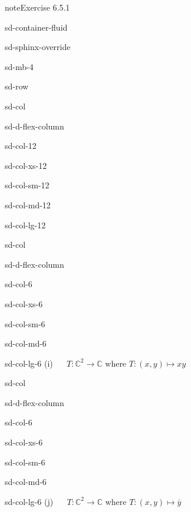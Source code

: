 \documentclass[letterpaper,10pt,english]{jupyterBook}
\begin{document}
\begin{sphinxadmonition}{note}{Exercise 6.5.1}
\begin{sphinxuseclass}{sd-container-fluid}
\begin{sphinxuseclass}{sd-sphinx-override}
\begin{sphinxuseclass}{sd-mb-4}
\begin{sphinxuseclass}{sd-row}
\begin{sphinxuseclass}{sd-col}
\begin{sphinxuseclass}{sd-d-flex-column}
\begin{sphinxuseclass}{sd-col-12}
\begin{sphinxuseclass}{sd-col-xs-12}
\begin{sphinxuseclass}{sd-col-sm-12}
\begin{sphinxuseclass}{sd-col-md-12}
\begin{sphinxuseclass}{sd-col-lg-12}
\end{sphinxuseclass}
\end{sphinxuseclass}
\end{sphinxuseclass}
\end{sphinxuseclass}
\end{sphinxuseclass}
\end{sphinxuseclass}
\end{sphinxuseclass}
\begin{sphinxuseclass}{sd-col}
\begin{sphinxuseclass}{sd-d-flex-column}
\begin{sphinxuseclass}{sd-col-6}
\begin{sphinxuseclass}{sd-col-xs-6}
\begin{sphinxuseclass}{sd-col-sm-6}
\begin{sphinxuseclass}{sd-col-md-6}
\begin{sphinxuseclass}{sd-col-lg-6}
\sphinxAtStartPar
(i)   \(T: \mathbb{C}^2 \to \mathbb{C}\) where \(T: (x, y) \mapsto x y\)

\end{sphinxuseclass}
\end{sphinxuseclass}
\end{sphinxuseclass}
\end{sphinxuseclass}
\end{sphinxuseclass}
\end{sphinxuseclass}
\end{sphinxuseclass}
\begin{sphinxuseclass}{sd-col}
\begin{sphinxuseclass}{sd-d-flex-column}
\begin{sphinxuseclass}{sd-col-6}
\begin{sphinxuseclass}{sd-col-xs-6}
\begin{sphinxuseclass}{sd-col-sm-6}
\begin{sphinxuseclass}{sd-col-md-6}
\begin{sphinxuseclass}{sd-col-lg-6}
\sphinxAtStartPar
(j)   \(T: \mathbb{C}^2 \to \mathbb{C}\) where \(T: (x, y) \mapsto \bar{y}\)


\end{sphinxuseclass}
\end{sphinxuseclass}
\end{sphinxuseclass}
\end{sphinxuseclass}
\end{sphinxuseclass}
\end{sphinxuseclass}
\end{sphinxuseclass}
\end{sphinxuseclass}
\end{sphinxuseclass}
\end{sphinxuseclass}
\end{sphinxuseclass}
\end{sphinxadmonition}
\end{document}

